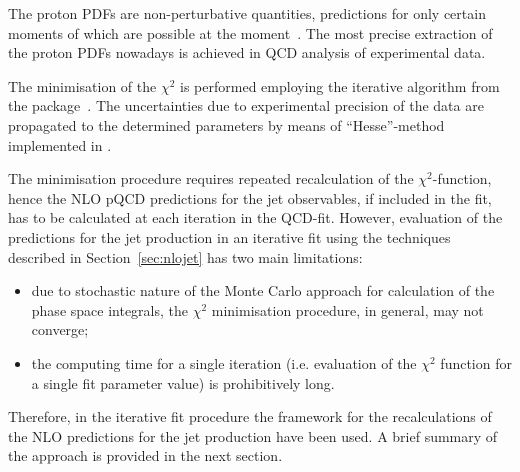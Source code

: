 The proton PDFs are non-perturbative quantities, predictions for only certain moments of which are possible at the moment~\cite{Hagler:2009ni}. The most precise extraction of the proton PDFs nowadays is achieved in QCD analysis of experimental data.

The minimisation of the $\chi^2$ is performed employing the iterative \migrad algorithm from the \minuit package~\cite{James:1975dr}. The uncertainties due to experimental precision of the data are propagated to the determined parameters by means of ``Hesse''-method implemented in \minuit.

The minimisation procedure requires repeated recalculation of the $\chi^2$-function, hence the NLO pQCD predictions for the jet observables, if included in the fit, has to be calculated at each iteration in the QCD-fit. However, evaluation of the predictions for the jet production in an iterative fit using the techniques described in Section~\ref{sec:nlojet} has two main limitations: 
\begin{itemize}
 \item due to stochastic nature of the Monte Carlo approach for calculation of the phase space integrals, the $\chi^2$ minimisation procedure,  in general, may not converge;
 \item the computing time for a single iteration (i.e. evaluation of the $\chi^2$ function for a single fit parameter value) is prohibitively long.
\end{itemize}
Therefore, in the iterative fit procedure the \fastnlo framework for the recalculations of the NLO predictions for the jet production have been used. A brief summary of the \fastnlo approach is provided in the next section. 
